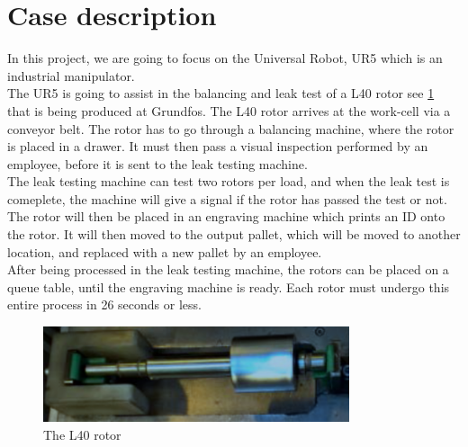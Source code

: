 \section{Case description} \label{ch:case description}

In this project, we are going to focus on the Universal Robot, UR5 which is an industrial manipulator.\\
The UR5 is going to assist in the balancing and leak test of a L40 rotor see \ref{fig:rotor} that is being produced at Grundfos. The L40 rotor arrives at the work-cell via a conveyor belt. The rotor has to go through a balancing machine, where the rotor is placed in a drawer. It must then pass a visual inspection performed by an employee, before it is sent to the leak testing machine.\\
The leak testing machine can test two rotors per load, and when the leak test is comeplete, the machine will give a signal if the rotor has passed the test or not. The rotor will then be placed in an engraving machine which prints an ID onto the rotor. It will then moved to the output pallet, which will be moved to another location, and replaced with a new pallet by an employee.\\ 
After being processed in the leak testing machine, the rotors can be placed on a queue table, until the engraving machine is ready. Each rotor must undergo this entire process in 26 seconds or less.\\


\begin{figure}
    \centering
    \includegraphics[width=9cm]{InitialProblemstatement/Case/rotorlille.PNG}
    \caption{The L40 rotor \cite{Case}}
    \label{fig:rotor}
\end{figure}



